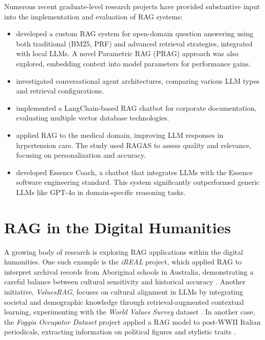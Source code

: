 \begin{spacing}{1.5}
Numerous recent graduate-level research projects have provided substantive input into the implementation and evaluation of RAG systems:
\begin{itemize}
    \item \textcite{antolini_experimental_2025} developed a custom RAG system for open-domain question answering using both traditional (BM25, PRF) and advanced retrieval strategies, integrated with local LLMs. A novel Parametric RAG (PRAG) approach was also explored, embedding context into model parameters for performance gains.
    \item \textcite{caramanna_progettazione_2024} investigated conversational agent architectures, comparing various LLM types and retrieval configurations.
    \item \textcite{florio_progettazione_2024} implemented a LangChain-based RAG chatbot for corporate documentation, evaluating multiple vector database technologies.
    \item \textcite{salcuni_utilizzo_2025} applied RAG to the medical domain, improving LLM responses in hypertension care. The study used RAGAS to assess quality and relevance, focusing on personalization and accuracy.
    \item \textcite{nicoletti_llms_2025} developed Essence Coach, a chatbot that integrates LLMs with the Essence software engineering standard. This system significantly outperformed generic LLMs like GPT-4o in domain-specific reasoning tasks.
\end{itemize}

\section{RAG in the Digital Humanities}
A growing body of research is exploring RAG applications within the digital humanities. One such example is the \textit{iREAL} project, which applied RAG to interpret archival records from Aboriginal schools in Australia, demonstrating a careful balance between cultural sensitivity and historical accuracy \citep{callaghan_prototyping_2025}. Another initiative, \textit{ValuesRAG}, focuses on cultural alignment in LLMs by integrating societal and demographic knowledge through retrieval-augmented contextual learning, experimenting with the \textit{World Values Survey} dataset \citep{seo_valuesrag_2025}. In another case, the \textit{Foggia Occupator Dataset} project applied a RAG model to post-WWII Italian periodicals, extracting information on political figures and stylistic traits \citep{ciletti_retrieval-augmented_2025}.


\end{spacing}
